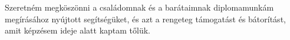 \documentclass[a4paper,12pt]{report}
\begin{document}
Szeretném megköszönni a családomnak és a barátaimnak diplomamunkám megírásához nyújtott segítségüket, és azt a rengeteg támogatást és bátorítást, amit képzésem ideje alatt kaptam tőlük.

\newpage
\pagestyle{headings}
\setcounter{page}{1}




















\end{document}
